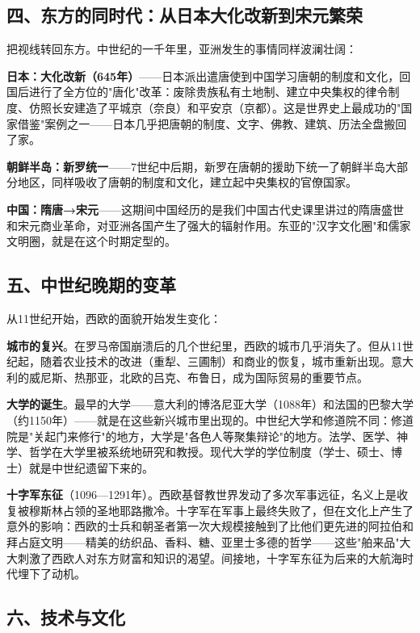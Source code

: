 \documentclass[a4paper,12pt]{ctexart}
\begin{document}
\subsection*{四、东方的同时代：从日本大化改新到宋元繁荣}

把视线转回东方。中世纪的一千年里，亚洲发生的事情同样波澜壮阔：

\textbf{日本：大化改新（645年）}——日本派出遣唐使到中国学习唐朝的制度和文化，回国后进行了全方位的"唐化"改革：废除贵族私有土地制、建立中央集权的律令制度、仿照长安建造了平城京（奈良）和平安京（京都）。这是世界史上最成功的"国家借鉴"案例之一——日本几乎把唐朝的制度、文字、佛教、建筑、历法全盘搬回了家。

\textbf{朝鲜半岛：新罗统一}——7世纪中后期，新罗在唐朝的援助下统一了朝鲜半岛大部分地区，同样吸收了唐朝的制度和文化，建立起中央集权的官僚国家。

\textbf{中国：隋唐→宋元}——这期间中国经历的是我们中国古代史课里讲过的隋唐盛世和宋元商业革命，对亚洲各国产生了强大的辐射作用。东亚的"汉字文化圈"和儒家文明圈，就是在这个时期定型的。

\subsection*{五、中世纪晚期的变革}

从11世纪开始，西欧的面貌开始发生变化：

\textbf{城市的复兴}。在罗马帝国崩溃后的几个世纪里，西欧的城市几乎消失了。但从11世纪起，随着农业技术的改进（重犁、三圃制）和商业的恢复，城市重新出现。意大利的威尼斯、热那亚，北欧的吕克、布鲁日，成为国际贸易的重要节点。

\textbf{大学的诞生}。最早的大学——意大利的博洛尼亚大学（1088年）和法国的巴黎大学（约1150年）——就是在这些新兴城市里出现的。中世纪大学和修道院不同：修道院是"关起门来修行"的地方，大学是"各色人等聚集辩论"的地方。法学、医学、神学、哲学在大学里被系统地研究和教授。现代大学的学位制度（学士、硕士、博士）就是中世纪遗留下来的。

\textbf{十字军东征}（1096—1291年）。西欧基督教世界发动了多次军事远征，名义上是收复被穆斯林占领的圣地耶路撒冷。十字军在军事上最终失败了，但在文化上产生了意外的影响：西欧的士兵和朝圣者第一次大规模接触到了比他们更先进的阿拉伯和拜占庭文明——精美的纺织品、香料、糖、亚里士多德的哲学——这些"舶来品"大大刺激了西欧人对东方财富和知识的渴望。间接地，十字军东征为后来的大航海时代埋下了动机。

\subsection*{六、技术与文化}
\end{document}
